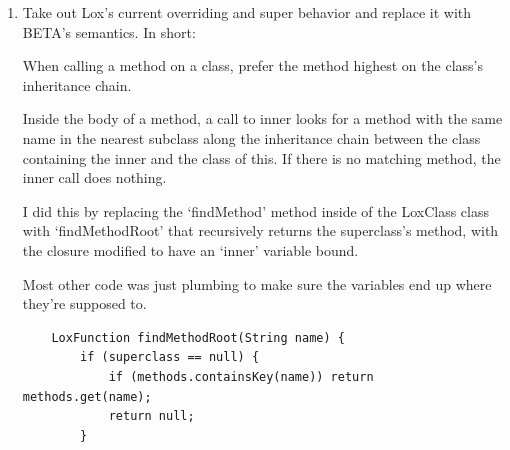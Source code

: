 \documentclass{article}
\begin{document}
\begin{enumerate}
{        The main difficulties of implementing this is in the Resolver. Because 
        there is no way to statically check if the baseClass of this statement is 
        a subclass or not. I ended up comprimising, letting the super always have 
        access to super, and defering the error to runtime.
        \begin{verbatim}
    @Override
    public Void visitClassPlusStmt(Stmt.ClassPlus stmt) {
        ClassType enclosingClass = currentClass;

        currentClass = ClassType.SUBCLASS; // although not "correct", good enough.
        // No good way to statically determine if this class is a subclass, so we just
        // let the user use SUPER.

        resolve(stmt.baseClass);
        beginScope();
        scopes.peek().put("this", true);

        for (Stmt.Function method : stmt.methods) {
            FunctionType declaration = FunctionType.METHOD;
            if (method.name.lexeme.equals("init")) {
                declaration = FunctionType.INITIALIZER;
            }
            resolveFunction(method, declaration);
        }
        endScope();

        currentClass = enclosingClass;

        return null;
    }
        \end{verbatim}
    }

    \item {
        Take out Lox’s current overriding and super behavior and replace it with BETA’s semantics. In short:

When calling a method on a class, prefer the method highest on the class’s inheritance chain.

Inside the body of a method, a call to inner looks for a method with the same name in the nearest subclass along the inheritance chain between the class containing the inner and the class of this. If there is no matching method, the inner call does nothing.

        I did this by replacing the `findMethod' method inside of the LoxClass
        class with `findMethodRoot' that recursively returns the superclass's 
        method, with the closure modified to have an `inner' variable bound.

        Most other code was just plumbing to make sure the variables end up where 
        they're supposed to.

        \begin{verbatim}
    LoxFunction findMethodRoot(String name) {
        if (superclass == null) {
            if (methods.containsKey(name)) return methods.get(name);
            return null;
        }


\end{verbatim}}
\end{enumerate}
\end{document}
